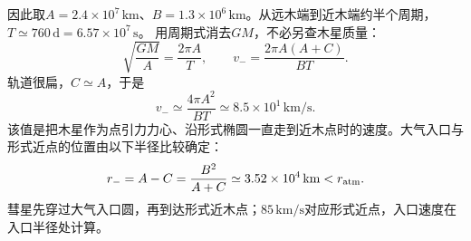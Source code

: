 \documentclass[UTF8,fontset=fandol,a4paper,11pt]{ctexart}
\begin{document}
因此取$A=2.4\times10^7\,\mathrm{km}$、$B=1.3\times10^6\,\mathrm{km}$。从远木端到近木端约半个周期，
$T\simeq760\,\mathrm d=6.57\times10^7\,\mathrm s$。
用周期式消去$GM$，不必另查木星质量：
\[
\sqrt{\frac{GM}{A}}=\frac{2\pi A}{T},\qquad
v_-=\frac{2\pi A(A+C)}{BT}.
\]
轨道很扁，$C\simeq A$，于是
\[
\boxed{v_-\simeq\frac{4\pi A^2}{BT}
\simeq8.5\times10^1\,\mathrm{km/s}}.
\]
该值是把木星作为点引力力心、沿形式椭圆一直走到近木点时的速度。大气入口与形式近点的位置由以下半径比较确定：
\[
r_-=A-C=\frac{B^2}{A+C}\simeq3.52\times10^4\,\mathrm{km}
<r_{\rm atm}.
\]
彗星先穿过大气入口圆，再到达形式近木点；$85\,\mathrm{km/s}$对应形式近点，入口速度在入口半径处计算。
\begin{center}\begin{minipage}{.98\linewidth}\centering
{}
\end{minipage}
\end{center}
\end{document}
